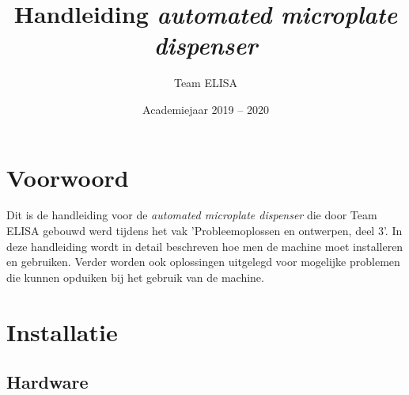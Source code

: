\documentclass[a4paper,twoside,kulak]{kulakreport} %
\title{Handleiding \textit{automated microplate dispenser}}
\author{Team ELISA}
\institute{Matthias Derez, Maxime Dujardin, Korneel Verkens, Seppe Vilain}
\date{Academiejaar 2019 -- 2020}
\begin{document}
	
	\titlepage
	

\chapter*{Voorwoord}


Dit is de handleiding voor de \textit{automated microplate dispenser} die door Team ELISA gebouwd werd tijdens het vak 'Probleemoplossen en ontwerpen, deel 3'. In deze handleiding wordt in detail beschreven hoe men de machine moet installeren en gebruiken. Verder worden ook oplossingen uitgelegd voor mogelijke problemen die kunnen opduiken bij het gebruik van de machine.




\chapter{Installatie}

\section{Hardware}
\label{sec: hardware}
\end{document}
